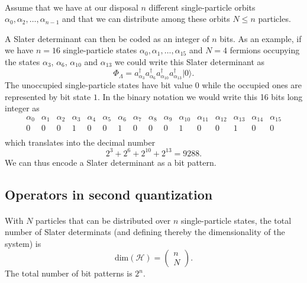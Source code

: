 \documentclass[%
twoside,                 %
final,                   %
10pt]{article}
\begin{document}
\paragraph{}
Assume that we have at our disposal $n$ different single-particle orbits
$\alpha_0,\alpha_2,\dots,\alpha_{n-1}$ and that we can distribute  among these orbits $N\le n$ particles.

A Slater  determinant can then be coded as an integer of $n$ bits. As an example, if we have $n=16$ single-particle states
$\alpha_0,\alpha_1,\dots,\alpha_{15}$ and $N=4$ fermions occupying the states $\alpha_3$, $\alpha_6$, $\alpha_{10}$ and $\alpha_{13}$
we could write this Slater determinant as  
\[
\Phi_{\Lambda} = a_{\alpha_3}^{\dagger} a_{\alpha_6}^{\dagger} a_{\alpha_{10}}^{\dagger} a_{\alpha_{13}}^{\dagger} |0\rangle.
\]
The unoccupied single-particle states have bit value $0$ while the occupied ones are represented by bit state $1$. 
In the binary notation we would write this   16 bits long integer as
\[
\begin{array}{cccccccccccccccc}
{\alpha_0}&{\alpha_1}&{\alpha_2}&{\alpha_3}&{\alpha_4}&{\alpha_5}&{\alpha_6}&{\alpha_7} & {\alpha_8} &{\alpha_9} & {\alpha_{10}} &{\alpha_{11}} &{\alpha_{12}} &{\alpha_{13}} &{\alpha_{14}} & {\alpha_{15}} \\
{0} & {0} &{0} &{1} &{0} &{0} &{1} &{0} &{0} &{0} &{1} &{0} &{0} &{1} &{0} & {0} \\
\end{array}
\]
which translates into the decimal number
\[
2^3+2^6+2^{10}+2^{13}=9288.
\]
We can thus encode a Slater determinant as a bit pattern.




\subsection{Operators in second quantization}

\paragraph{}
With $N$ particles that can be distributed over $n$ single-particle states, the total number of Slater determinats (and defining thereby the dimensionality of the system) is
\[
\mathrm{dim}(\mathcal{H}) = \left(\begin{array}{c} n \\N\end{array}\right).
\]
The total number of bit patterns is $2^n$.
\end{document}
